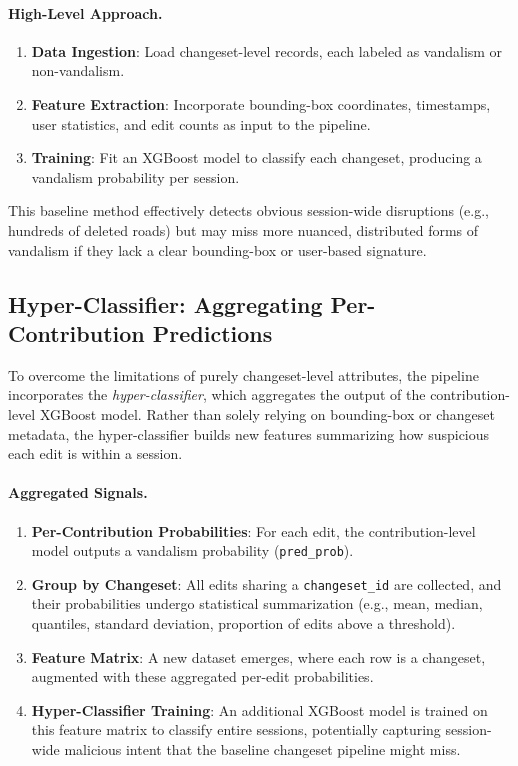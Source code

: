 \documentclass[
    13pt, %
    a4paper, %
    DIV14, %
    listof=totoc, %
    bibliography=totoc, %
    index=totoc, %
    headsepline
]{scrreprt}
\begin{document}
\paragraph{High-Level Approach.}
\begin{enumerate}
    \item \textbf{Data Ingestion}: Load changeset-level records, each labeled as vandalism or non-vandalism.
    \item \textbf{Feature Extraction}: Incorporate bounding-box coordinates, timestamps, user statistics, and edit counts as input to the pipeline.
    \item \textbf{Training}: Fit an XGBoost model to classify each changeset, producing a vandalism probability per session.
\end{enumerate}

This baseline method effectively detects obvious session-wide disruptions (e.g., hundreds of deleted roads) but may miss more nuanced, distributed forms of vandalism if they lack a clear bounding-box or user-based signature.

\subsection{Hyper-Classifier: Aggregating Per-Contribution Predictions}
\label{subsec:hyper_classifier}

To overcome the limitations of purely changeset-level attributes, the pipeline incorporates the \emph{hyper-classifier}, which aggregates the output of the contribution-level XGBoost model. Rather than solely relying on bounding-box or changeset metadata, the hyper-classifier builds new features summarizing how suspicious each edit is within a session.

\paragraph{Aggregated Signals.}
\begin{enumerate}
    \item \textbf{Per-Contribution Probabilities}: For each edit, the contribution-level model outputs a vandalism probability (\texttt{pred\_prob}).
    \item \textbf{Group by Changeset}: All edits sharing a \texttt{changeset\_id} are collected, and their probabilities undergo statistical summarization (e.g., mean, median, quantiles, standard deviation, proportion of edits above a threshold).
    \item \textbf{Feature Matrix}: A new dataset emerges, where each row is a changeset, augmented with these aggregated per-edit probabilities.
    \item \textbf{Hyper-Classifier Training}: An additional XGBoost model is trained on this feature matrix to classify entire sessions, potentially capturing session-wide malicious intent that the baseline changeset pipeline might miss.
\end{enumerate}
\end{document}
